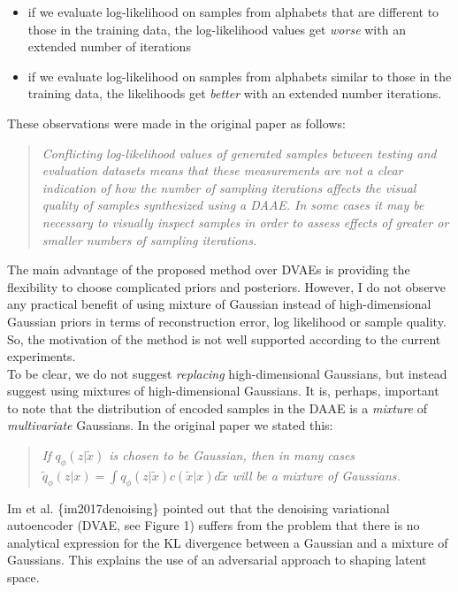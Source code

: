 \documentclass[a4paper,11pt]{article}
\begin{document}
\begin{itemize}
    \item if we evaluate log-likelihood on samples from alphabets that are different to those in the training data, the log-likelihood values get {\em worse} with an extended number of iterations
    \item if we evaluate log-likelihood on samples from alphabets similar to those in the training data, the likelihoods get {\em better} with an extended number iterations.
\end{itemize}

These observations were made in the original paper as follows:
 \begin{quote}
 {\it Conflicting log-likelihood values of generated samples between testing and evaluation datasets means that these measurements are not a clear indication of how the number of sampling iterations affects the visual quality of samples synthesized using a DAAE. In some cases it may be necessary to visually inspect samples in order to assess effects of greater or smaller numbers of sampling iterations. }
 \end{quote}


{\color{blue}
The main advantage of the proposed method over DVAEs is providing the flexibility to choose complicated priors and posteriors. However, I do not observe any practical benefit of using mixture of Gaussian instead of high-dimensional Gaussian priors in terms of reconstruction error, log likelihood or sample quality. So, the motivation of the method is not well supported according to the current experiments.}\\


To be clear, we do not suggest {\em replacing} high-dimensional Gaussians, but instead suggest using mixtures of high-dimensional Gaussians. It is, perhaps, important to note that the distribution of encoded samples in the DAAE is a {\em mixture} of {\em multivariate} Gaussians. In the original paper we stated this:
\begin{quote}
{\it If $q_\phi(z|\tilde{x})$ is chosen to be Gaussian, then in many cases $\tilde{q}_\phi(z|x) = \int q_\phi(z|\tilde{x})c(\tilde{x}|x)d \tilde{x}$ will be a mixture of Gaussians.}
\end{quote}
Im et al. \{im2017denoising\} pointed out that the denoising variational autoencoder (DVAE, see Figure 1) suffers from the problem that there is no analytical expression for the KL divergence between a Gaussian and a mixture of Gaussians. This explains the use of an adversarial approach to 
shaping latent space.\\
\end{document}
